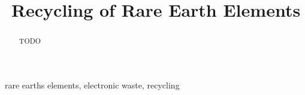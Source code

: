 \documentclass[conference]{IEEEtran}
\begin{document}
\title{Recycling of Rare Earth Elements}

\author{
}

\maketitle

\begin{abstract}
TODO
\end{abstract}

\begin{IEEEkeywords}
rare earths elements, electronic waste, recycling
\end{IEEEkeywords}















\printbibliography
\end{document}
